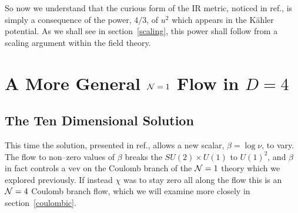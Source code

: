 \documentclass[a4paper,12pt]{article}
\begin{document}
So now we understand that the curious form of the IR metric, noticed
in ref.\cite{jlp}, is simply a consequence of the power, $4/3$, of
$u^2$ which appears in the K\"ahler potential. As we shall see in
section~\ref{scaling}, this power shall follow from a scaling
argument within the field theory. 

\section{A More General ${\cal N}=1$ Flow in $D=4$}

\subsection{The Ten Dimensional Solution}

This time the solution, presented in ref.\cite{warnernew}, allows a
new scalar, $\beta=\log\nu$, to vary.  The flow to non--zero values of
$\beta$ breaks the $SU(2)\times U(1)$ to $U(1)^2$, and $\beta$ in fact
controls a vev on the Coulomb branch of the ${\cal N}=1$ theory which
we explored previously. If instead $\chi$ was to stay zero all along
the flow this is an ${\cal N}=4$ Coulomb branch flow, which we will
examine more closely in section~\ref{coulombic}.
 
\end{document}
